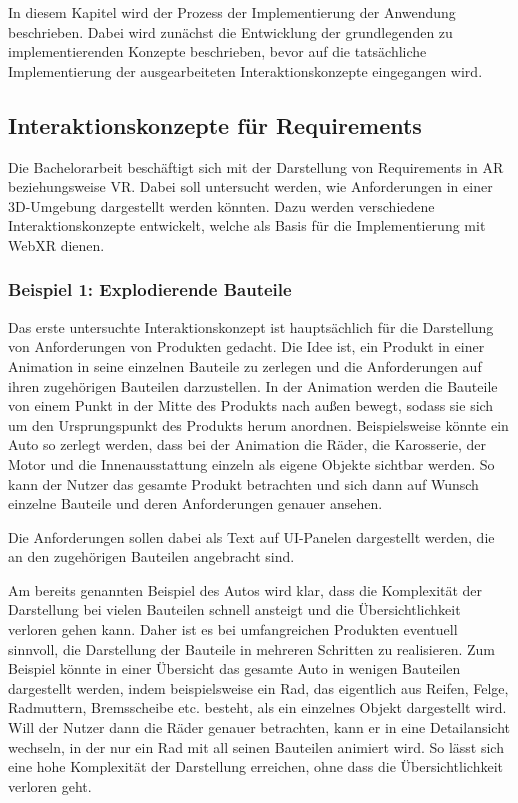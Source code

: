 In diesem Kapitel wird der Prozess der Implementierung der Anwendung beschrieben.
Dabei wird zunächst die Entwicklung der grundlegenden zu implementierenden Konzepte beschrieben, bevor auf die tatsächliche Implementierung der ausgearbeiteten Interaktionskonzepte eingegangen wird.

\subsection{Interaktionskonzepte für Requirements}

Die Bachelorarbeit beschäftigt sich mit der Darstellung von Requirements in AR beziehungsweise VR.
Dabei soll untersucht werden, wie Anforderungen in einer 3D-Umgebung dargestellt werden könnten.
Dazu werden verschiedene Interaktionskonzepte entwickelt, welche als Basis für die Implementierung mit WebXR dienen.


\subsubsection{Beispiel 1: Explodierende Bauteile}

Das erste untersuchte Interaktionskonzept ist hauptsächlich für die Darstellung von Anforderungen von Produkten gedacht.
Die Idee ist, ein Produkt in einer Animation in seine einzelnen Bauteile zu zerlegen und die Anforderungen auf ihren zugehörigen Bauteilen darzustellen.
In der Animation werden die Bauteile von einem Punkt in der Mitte des Produkts nach außen bewegt, sodass sie sich um den Ursprungspunkt des Produkts herum anordnen.
Beispielsweise könnte ein Auto so zerlegt werden, dass bei der Animation die Räder, die Karosserie, der Motor und die Innenausstattung einzeln als eigene Objekte sichtbar werden.
So kann der Nutzer das gesamte Produkt betrachten und sich dann auf Wunsch einzelne Bauteile und deren Anforderungen genauer ansehen.

Die Anforderungen sollen dabei als Text auf UI-Panelen dargestellt werden, die an den zugehörigen Bauteilen angebracht sind.

Am bereits genannten Beispiel des Autos wird klar, dass die Komplexität der Darstellung bei vielen Bauteilen schnell ansteigt und die Übersichtlichkeit verloren gehen kann.
Daher ist es bei umfangreichen Produkten eventuell sinnvoll, die Darstellung der Bauteile in mehreren Schritten zu realisieren.
Zum Beispiel könnte in einer Übersicht das gesamte Auto in wenigen Bauteilen dargestellt werden, indem beispielsweise ein Rad, das eigentlich aus Reifen, Felge, Radmuttern, Bremsscheibe etc. besteht, als ein einzelnes Objekt dargestellt wird.
Will der Nutzer dann die Räder genauer betrachten, kann er in eine Detailansicht wechseln, in der nur ein Rad mit all seinen Bauteilen animiert wird.
So lässt sich eine hohe Komplexität der Darstellung erreichen, ohne dass die Übersichtlichkeit verloren geht.


